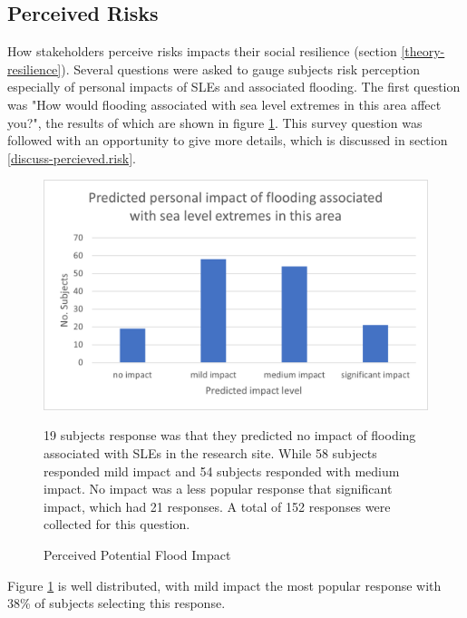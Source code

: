 \paragraph{}



\subsection{Perceived Risks}
How stakeholders perceive risks impacts their social resilience (section \ref{theory-resilience}). Several questions were asked to gauge subjects risk perception especially of personal impacts of SLEs and associated flooding. The first question was "How would flooding associated with sea level extremes in this area affect you?", the results of which are shown in figure \ref{fig:flood_impact_pred}. This survey question was followed with an opportunity to give more details, which is discussed in section \ref{discuss-percieved.risk}.

\begin{figure}[H]
    \centering
    \includegraphics{fig_results/impact-flood-answers.png}
    \caption{Perceived Potential Flood Impact}{
    19 subjects response was that they predicted no impact of flooding associated with SLEs in the research site. While 58 subjects responded mild impact and 54 subjects responded with medium impact. No impact was a less popular response that significant impact, which had 21 responses. A total of 152 responses were collected for this question. }
    \label{fig:flood_impact_pred}
\end{figure}

Figure \ref{fig:flood_impact_pred} is well distributed, with mild impact the most popular response with 38\% of subjects selecting this response. 
\paragraph{}

